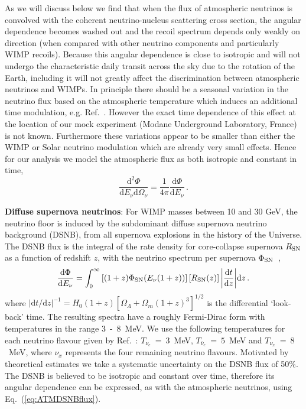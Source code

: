 As we will discuss below we find that when the flux of atmospheric neutrinos is convolved with the coherent neutrino-nucleus scattering cross section, the angular dependence becomes washed out and the recoil spectrum depends only weakly on direction (when compared with other neutrino components and particularly WIMP recoils). Because this angular dependence is close to isotropic and will not undergo the characteristic daily transit across the sky due to the rotation of the Earth, including it will not greatly affect the discrimination between atmospheric neutrinos and WIMPs. In principle there should be a seasonal variation in the neutrino flux based on the atmospheric temperature which induces an additional time modulation, e.g. Ref.~\cite{Tilav:2010hj}. However the exact time dependence of this effect at the location of our mock experiment (Modane Underground Laboratory, France) is not known. Furthermore these variations appear to be smaller than either the WIMP or Solar neutrino modulation which are already very small effects. Hence for our analysis we model the atmospheric flux as both isotropic and constant in time,
\begin{equation}
  \frac{\textrm{d}^2 \Phi}{\textrm{d}E_\nu \textrm{d}\Omega_\nu} = \frac{1}{4\pi}\frac{\textrm{d} \Phi}{\textrm{d} E_\nu}  \,.
\label{eq:ATMDSNBflux}
\end{equation}



{\bf Diffuse supernova neutrinos}: For WIMP masses between 10 and 30 GeV, the neutrino floor is induced by the subdominant diffuse supernova neutrino background (DSNB), from all supernova explosions in the history of the Universe. The DSNB flux is the integral of the rate density for core-collapse supernova $R_{\rm SN}$ as a function of redshift $z$, with the neutrino spectrum per supernova $\Phi_{\rm SN}$~\cite{Beacom:2010kk},
\begin{equation}
 \frac{\textrm{d}\Phi}{\textrm{d}E_\nu} = \int_0^\infty \left[(1+z) \Phi_{\rm SN}(E_\nu(1+z))\right]\left[R_{\rm SN}(z)\right] \bigg|\frac{\textrm{d}t}{\textrm{d}z}\bigg| \textrm{d}z \, .
\end{equation}
where $|\textrm{d}t/\textrm{d}z|^{-1} = H_0(1+z)[\Omega_\Lambda + \Omega_m(1+z)^3]^{1/2}$ is the differential `look-back' time. The resulting spectra have a roughly Fermi-Dirac form with temperatures in the range 3~-~8~MeV. We use the following temperatures for each neutrino flavour given by Ref.~\cite{Beacom:2010kk}: $T_{\nu_e}~=~3$~MeV, $T_{\bar{\nu}_e}~=~5$~MeV and $T_{\nu_x}~=~8$~MeV, where $\nu_x$ represents the four remaining neutrino flavours. Motivated by theoretical estimates we take a systematic uncertainty on the DSNB flux of 50\%. The DSNB is believed to be isotropic and constant over time, therefore its angular dependence can be expressed, as with the atmospheric neutrinos, using Eq.~(\ref{eq:ATMDSNBflux}).  


